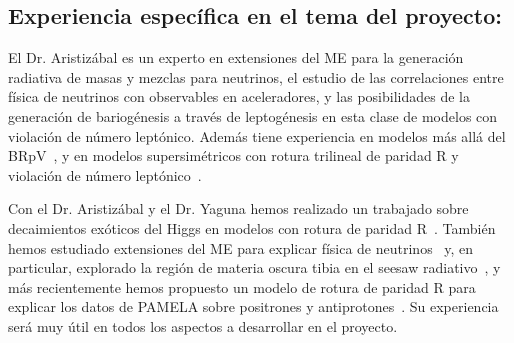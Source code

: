 \subsection{Experiencia específica en el tema del proyecto:}
El Dr. Aristizábal es un experto en extensiones del ME para la
generación radiativa de masas y mezclas para neutrinos, el estudio de
las correlaciones entre física de neutrinos con observables en
aceleradores\cite{AristizabalSierra:2006ri,AristizabalSierra:2006gb,AristizabalSierra:2007nf,Sierra:2008wj},
y las posibilidades de la generación de bariogénesis a través de
leptogénesis en esta clase de modelos con violación de número
leptónico\cite{AristizabalSierra:2010mv,AristizabalSierra:2009bh,AristizabalSierra:2009mq,Sierra:2009bm,AristizabalSierra:2007ur}. Además
tiene experiencia en modelos más allá del
BRpV~\cite{AristizabalSierra:2003ix}, y en modelos supersimétricos con
rotura trilineal de paridad R y violación de número
leptónico~\cite{Sierra:2009zq,AristizabalSierra:2008ye,AristizabalSierra:2004cy}.

Con el Dr. Aristizábal y el Dr. Yaguna hemos realizado un trabajado
sobre decaimientos exóticos del Higgs en modelos con rotura de paridad
R~\cite{AristizabalSierra:2008ye}. También hemos estudiado extensiones
del ME para explicar física de
neutrinos~\cite{Sierra:2008wj,AristizabalSierra:2006ri} y, en
particular, explorado la región de materia oscura tibia en el seesaw
radiativo~\cite{Sierra:2008wj}, y más recientemente hemos propuesto un
modelo de rotura de paridad R para explicar los datos de PAMELA sobre
positrones y antiprotones~\cite{Sierra:2009zq}.  Su experiencia será
muy útil en todos los aspectos a desarrollar en el proyecto.
